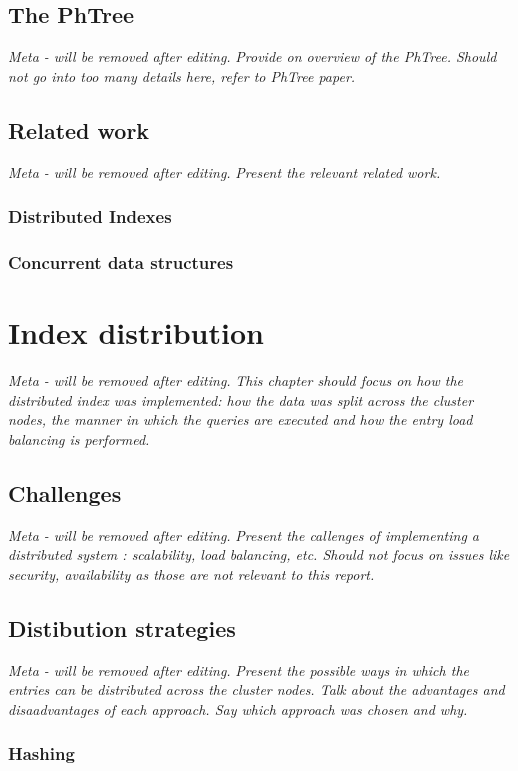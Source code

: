 \documentclass[11pt,a4paper]{globis-book}
\begin{document}
\section{The PhTree}
\textit{Meta - will be removed after editing.}
\textit{Provide on overview of the PhTree. Should not go into too many details here, refer to PhTree paper.}

\section{Related work}

\textit{Meta - will be removed after editing.}
\textit{Present the relevant related work.}
\subsection{Distributed Indexes}
\subsection{Concurrent data structures}

\chapter{Index distribution}

\textit{Meta - will be removed after editing.}
\textit{This chapter should focus on how the distributed index was implemented: how the data was split across the cluster nodes, the manner in which the queries are executed and how the entry load balancing is performed.} 
\section{Challenges}

\textit{Meta - will be removed after editing.}
\textit{Present the callenges of implementing a distributed system : scalability, load balancing, etc. Should not focus on issues like security, availability as those are not relevant to this report.}
\section{Distibution strategies}

\textit{Meta - will be removed after editing.}
\textit{Present the possible ways in which the entries can be distributed across the cluster nodes. Talk about the advantages and disaadvantages of each approach. Say which approach was chosen and why.}
\subsection{Hashing}
\end{document}
